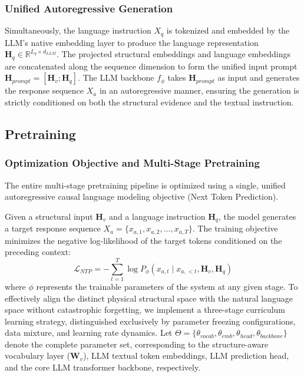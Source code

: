 \subsubsection{Unified Autoregressive Generation}
Simultaneously, the language instruction $X_q$ is tokenized and embedded by the LLM's native embedding layer to produce the language representation $\mathbf{H}_q \in \mathbb{R}^{L_q \times d_{LLM}}$. The projected structural embeddings and language embeddings are concatenated along the sequence dimension to form the unified input prompt $\mathbf{H}_{prompt} = [\mathbf{H}_v; \mathbf{H}_q]$. The LLM backbone $f_\phi$ takes $\mathbf{H}_{prompt}$ as input and generates the response sequence $X_a$ in an autoregressive manner, ensuring the generation is strictly conditioned on both the structural evidence and the textual instruction.

 


\subsection{Pretraining}
\subsubsection{Optimization Objective and Multi-Stage Pretraining}

The entire multi-stage pretraining pipeline is optimized using a single, unified autoregressive causal language modeling objective (Next Token Prediction).  

Given a structural input $\mathbf{H}_v$ and a language instruction $\mathbf{H}_q$, the model generates a target response sequence $X_a = \{x_{a,1}, x_{a,2}, ..., x_{a,T}\}$. The training objective minimizes the negative log-likelihood of the target tokens conditioned on the preceding context:
\begin{equation}
    \mathcal{L}_{NTP} = -\sum_{t=1}^{T} \log P_\phi (x_{a,t} \mid x_{a,<t}, \mathbf{H}_v, \mathbf{H}_q)
\end{equation}
where $\phi$ represents the trainable parameters of the system at any given stage. To effectively align the distinct physical structural space with the natural language space without catastrophic forgetting, we implement a three-stage curriculum learning strategy, distinguished exclusively by parameter freezing configurations, data mixture, and learning rate dynamics. Let $\Theta = \{\theta_{vocab}, \theta_{emb}, \theta_{head}, \theta_{backbone}\}$ denote the complete parameter set, corresponding to the structure-aware vocabulary layer ($\mathbf{W}_v$), LLM textual token embeddings, LLM prediction head, and the core LLM transformer backbone, respectively.

